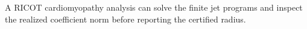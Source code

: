 A RICOT cardiomyopathy analysis can solve the finite jet programs and inspect the realized coefficient norm before reporting the certified radius.
